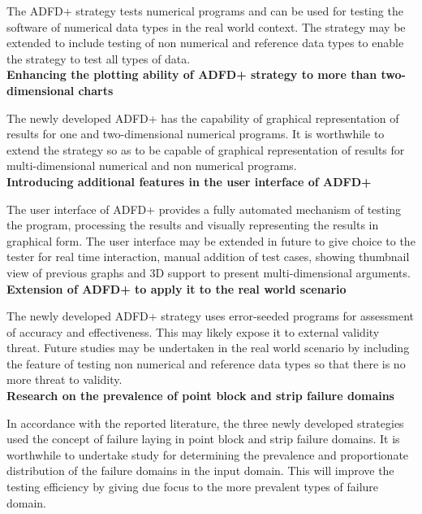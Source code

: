 The ADFD+ strategy tests numerical programs and can be used for testing the software of numerical data types in the real world context. The strategy may be extended to include testing of  
non numerical and reference data types to enable the strategy to test all types of data. \\






\textbf{Enhancing the plotting ability of ADFD+ strategy to more than two-dimensional charts}

The newly developed ADFD+ has the capability of graphical representation of results for one and two-dimensional numerical programs. It is worthwhile to extend the strategy so as to be capable of graphical representation of results for multi-dimensional numerical and non numerical programs. \\

\textbf{Introducing additional features in the user interface of ADFD+}

The user interface of ADFD+ provides a fully automated mechanism of testing the program, processing the results and visually representing the results in graphical form. The user interface may be extended in future to give choice to the tester for real time interaction, manual addition of test cases, showing thumbnail view of previous graphs and 3D support to present multi-dimensional arguments.\\

\textbf{Extension of ADFD+ to apply it to the real world scenario}

The newly developed ADFD+ strategy uses error-seeded programs for assessment of accuracy and effectiveness. This may likely expose it to external validity threat.  Future studies may be undertaken in the real world scenario by including the feature of testing non numerical and reference data types so that there is no more threat to validity.  \\

\textbf{Research on the prevalence of point block and strip failure domains}

In accordance with the reported literature, the three newly developed strategies used the concept of failure laying in point block and strip failure domains. It is worthwhile to undertake study for determining the prevalence and proportionate distribution of the failure domains in the input domain. This will improve the testing efficiency by giving due focus to the more prevalent types of failure domain.  \\


